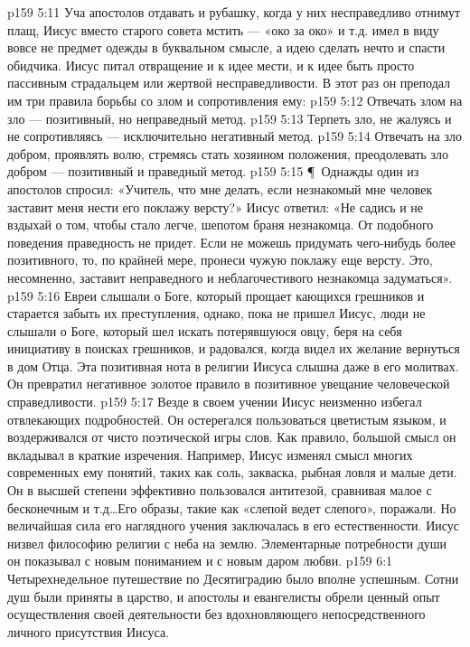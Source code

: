 \vs p159 5:11 Уча апостолов отдавать и рубашку, когда у них несправедливо отнимут плащ, Иисус вместо старого совета мстить --- «око за око» и т.д. имел в виду вовсе не предмет одежды в буквальном смысле, а идею сделать нечто  и спасти обидчика. Иисус питал отвращение и к идее мести, и к идее быть просто пассивным страдальцем или жертвой несправедливости. В этот раз он преподал им три правила борьбы со злом и сопротивления ему:
\vs p159 5:12 \bibnobreakspace Отвечать злом на зло --- позитивный, но неправедный метод.
\vs p159 5:13 \bibnobreakspace Терпеть зло, не жалуясь и не сопротивляясь --- исключительно негативный метод.
\vs p159 5:14 \bibnobreakspace Отвечать на зло добром, проявлять волю, стремясь стать хозяином положения, преодолевать зло добром --- позитивный и праведный метод.
\vs p159 5:15 \P\ Однажды один из апостолов спросил: «Учитель, что мне делать, если незнакомый мне человек заставит меня нести его поклажу версту?» Иисус ответил: «Не садись и не вздыхай о том, чтобы стало легче, шепотом браня незнакомца. От подобного поведения праведность не придет. Если не можешь придумать чего\hyp{}нибудь более позитивного, то, по крайней мере, пронеси чужую поклажу еще версту. Это, несомненно, заставит неправедного и неблагочестивого незнакомца задуматься».
\vs p159 5:16 Евреи слышали о Боге, который прощает кающихся грешников и старается забыть их преступления, однако, пока не пришел Иисус, люди не слышали о Боге, который шел искать потерявшуюся овцу, беря на себя инициативу в поисках грешников, и радовался, когда видел их желание вернуться в дом Отца. Эта позитивная нота в религии Иисуса слышна даже в его молитвах. Он превратил негативное золотое правило в позитивное увещание человеческой справедливости.
\vs p159 5:17 Везде в своем учении Иисус неизменно избегал отвлекающих подробностей. Он остерегался пользоваться цветистым языком, и воздерживался от чисто поэтической игры слов. Как правило, большой смысл он вкладывал в краткие изречения. Например, Иисус изменял смысл многих современных ему понятий, таких как соль, закваска, рыбная ловля и малые дети. Он в высшей степени эффективно пользовался антитезой, сравнивая малое с бесконечным и т.д\ldots Его образы, такие как «слепой ведет слепого», поражали. Но величайшая сила его наглядного учения заключалась в его естественности. Иисус низвел философию религии с неба на землю. Элементарные потребности души он показывал с новым пониманием и с новым даром любви.
\vs p159 6:1 Четырехнедельное путешествие по Десятиградию было вполне успешным. Сотни душ были приняты в царство, и апостолы и евангелисты обрели ценный опыт осуществления своей деятельности без вдохновляющего непосредственного личного присутствия Иисуса.
